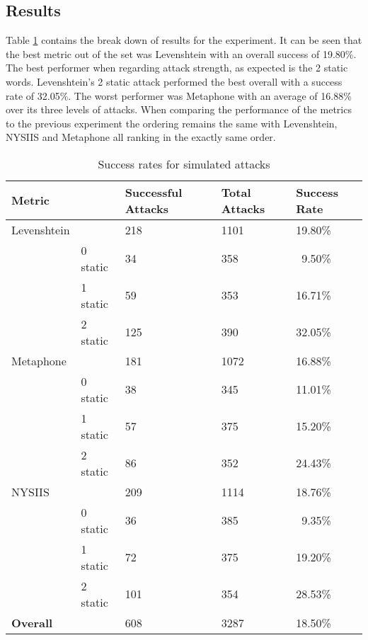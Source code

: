 \subsection*{Results}
Table \ref{tab:exp2_attacks} contains the break down of results for the experiment. It can be seen that the best metric out of the set was Levenshtein with an overall success of 19.80\%. The best performer when regarding attack strength, as expected is the 2 static words. Levenshtein's 2 static attack performed the best overall with a success rate of 32.05\%. The worst performer was Metaphone with an average of 16.88\% over its three levels of attacks. When comparing the performance of the metrics to the previous experiment the ordering remains the same with Levenshtein, NYSIIS and Metaphone all ranking in the exactly same order.

\begin{table}
    \centering
    \begin{tabular}{|ll|l|l|l|}
        \hline
        \textbf{Metric} & & \textbf{Successful Attacks} & \textbf{Total Attacks} & \textbf{Success Rate} \\
        \hline
        Levenshtein && 218 & 1101 & 19.80\% \\
        \hline
        & 0 static   & 34  & 358  & ~9.50\% \\
        & 1 static   & 59  & 353  & 16.71\% \\
        & 2 static   & 125  & 390  & 32.05\% \\
        \hline\hline
        Metaphone &&  181 & 1072 & 16.88\% \\
        \hline
        & 0 static   & 38 & 345 & 11.01\% \\
        & 1 static   & 57 & 375 & 15.20\% \\
        & 2 static   & 86 & 352 & 24.43\% \\
        \hline\hline
        NYSIIS &&  209 & 1114 & 18.76\% \\
        \hline
        & 0 static   & 36 & 385 & ~9.35\% \\
        & 1 static   & 72 & 375 & 19.20\% \\
        & 2 static   & 101 & 354 & 28.53\% \\
        \hline\hline
        \textbf{Overall} & & 608 & 3287 & 18.50\% \\
        \hline\hline
    \end{tabular}
    \caption{Success rates for simulated attacks}
    \label{tab:exp2_attacks}
\end{table}

